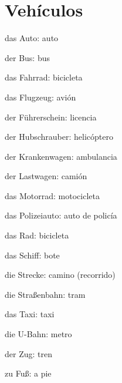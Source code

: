 \section{Vehículos}
\begin{multicols}{2}
\begin{myitemize}
\item das Auto: auto
\item der Bus: bus
\item das Fahrrad: bicicleta
\item das Flugzeug: avión
\item der Führerschein: licencia
\item der Hubschrauber: helicóptero
\item der Krankenwagen: ambulancia
\item der Lastwagen: camión
\item das Motorrad: motocicleta
\item das Polizeiauto: auto de policía
\item das Rad: bicicleta
\item das Schiff: bote
\item die Strecke: camino (recorrido)
\item die Straßenbahn: tram
\item das Taxi: taxi
\item die U-Bahn: metro
\item der Zug: tren
\item zu Fuß: a pie
\end{myitemize}
\end{multicols}